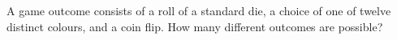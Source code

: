 A game outcome consists of a roll of a standard die, a choice of one of twelve distinct colours, and a coin flip. How many different outcomes are possible?
